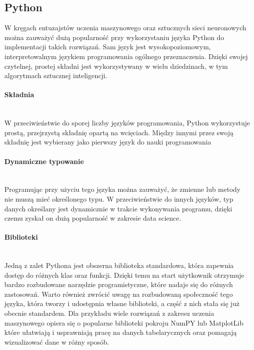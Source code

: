 \subsection{Python}
W kręgach entuzajstów uczenia maszynowego oraz sztucznych sieci neuronowych można zauważyć dużą popularność przy wykorzystaniu języka Python do implementacji takich rozwiązań. Sam język jest wysokopoziomowym, interpretowalnym językiem programowania ogólnego przeznaczenia. Dzięki swojej czytelnej, prostej składni jest wykorzystywany w wielu dziedzinach, w tym algorytmach sztucznej inteligencji.

\paragraph{Składnia}\mbox{}\\
W przeciwieństwie do sporej liczby języków programowania, Python wykorzystuje prostą, przejrzystą składnię opartą na wcięciach. Między innymi przez swoją składnię jest wybierany jako pierwszy język do nauki programowania

\paragraph{Dynamiczne typowanie}\mbox{}\\
Programując przy użyciu tego języka można zauważyć, że zmienne lub metody nie muszą mieć określonego typu. W przeciwieństwie do innych języków, typ danych określany jest dynamicznie w trakcie wykonywania programu, dzięki czemu zyskał on dużą popularność w zakresie data science.

\paragraph{Biblioteki}\mbox{}\\
Jedną z zalet Pythona jest obszerna biblioteka standardowa, która zapewnia dostęp do różnych klas oraz funkcji. Dzięki temu na start użytkownik otrzymuje bardzo rozbudowane narzędzie programistyczne, które nadaje się do różnych zastosowań. Warto również zwrócić uwagę na rozbudowaną społeczność tego języka, która tworzy i udostępnia własne biblioteki, a część z nich stała się już obecnie standardem. Dla przykładu wiele rozwiązań z zakresu uczenia maszynowego opiera się o popularne biblioteki pokroju NumPY lub MatplotLib które ułatwiają i usprawniają pracę na danych tabelarycznych oraz pomagają wizualizować dane w różny sposób.

